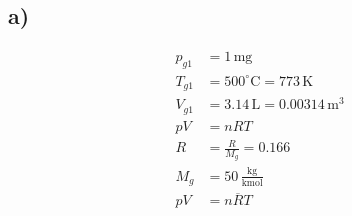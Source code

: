 

\subsection*{a)}
\begin{align*}
    p_{g1} &= 1 \, \text{mg} \\
    T_{g1} &= 500^\circ \text{C} = 773 \, \text{K} \\
    V_{g1} &= 3.14 \, \text{L} = 0.00314 \, \text{m}^3 \\
    pV &= nRT \\
    R &= \frac{R}{M_g} = 0.166 \\
    M_g &= 50 \, \frac{\text{kg}}{\text{kmol}} \\
    pV &= n \overline{R} T
\end{align*}